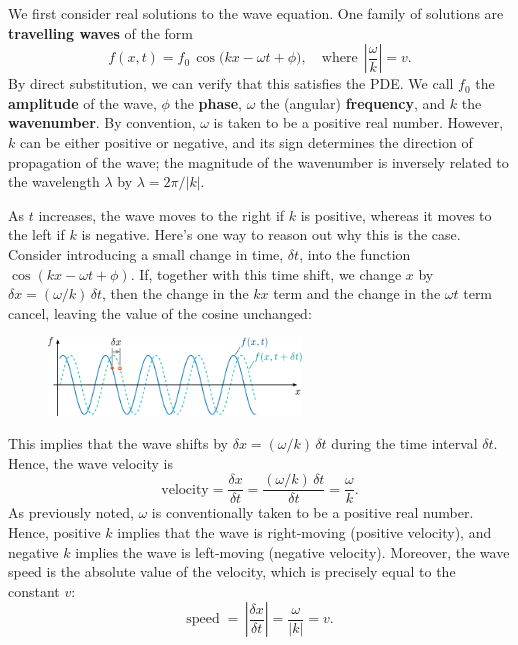 \documentclass[10pt,a4paper]{article}
\begin{document}
We first consider real solutions to the wave equation. One family of
solutions are \textbf{travelling waves} of the form
\begin{equation}
f(x,t) = f_0 \, \cos\!\big(kx - \omega t + \phi\big),\quad\mathrm{where}\;\, \left|\frac{\omega}{k}\right| = v.
\label{realsol}
\end{equation}
By direct substitution, we can verify that this satisfies the PDE. We
call $f_0$ the \textbf{amplitude} of the wave, $\phi$ the
\textbf{phase}, $\omega$ the (angular) \textbf{frequency}, and $k$
the \textbf{wavenumber}. By convention, $\omega$ is taken to be a
positive real number. However, $k$ can be either positive or
negative, and its sign determines the direction of propagation of the
wave; the magnitude of the wavenumber is inversely related to the
wavelength $\lambda$ by $\lambda = 2\pi/|k|$.
    
As $t$ increases, the wave moves to the right if $k$ is positive,
whereas it moves to the left if $k$ is negative. Here's one way to
reason out why this is the case. Consider introducing a small change
in time, $\delta t$, into the function $\cos(kx - \omega t +
\phi)$. If, together with this time shift, we change $x$ by $\delta x
= (\omega/k)\, \delta t$, then the change in the $kx$ term and the
change in the $\omega t$ term cancel, leaving the value of the cosine
unchanged:

\begin{figure}[ht]
  \centering\includegraphics[width=0.6\textwidth]{wave_velocity}
\end{figure}

\noindent
This implies that the wave shifts by $\delta x = (\omega/k)\, \delta
t$ during the time interval $\delta t$. Hence, the wave velocity is
\begin{equation}
\textrm{velocity} = \frac{\delta x}{\delta t} = \frac{(\omega/k)\,\delta t}{\delta t} = \frac{\omega}{k}.
\end{equation}
As previously noted, $\omega$ is conventionally taken to be a positive
real number. Hence, positive $k$ implies that the wave is right-moving
(positive velocity), and negative $k$ implies the wave is left-moving
(negative velocity). Moreover, the wave speed is the absolute value of
the velocity, which is precisely equal to the constant $v$:
\begin{equation}
\textrm{speed}\; = \, \left|\frac{\delta x}{\delta t}\right| = \frac{\omega}{\left|k\right|} = v.
\end{equation}
\end{document}
